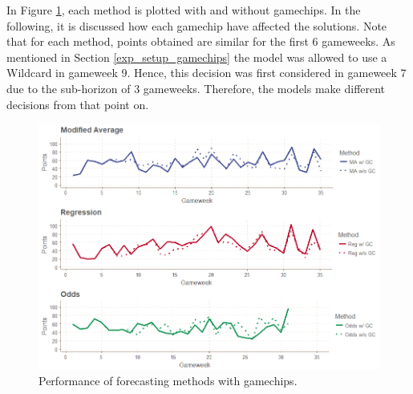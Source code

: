 \begin{table}[H]
\centering
{}
\caption{Results including gamechips.}
\label{tab:res_incl_gamechips}
\end{table}



In Figure \ref{fig:res_comp_gamechips}, each method is plotted with and without gamechips. In the following, it is discussed how each gamechip have affected the solutions. Note that for each method, points obtained are similar for the first 6 gameweeks. As mentioned in Section \ref{exp_setup_gamechips} the model was allowed to use a Wildcard in gameweek 9. Hence, this decision was first considered in gameweek 7 due to the sub-horizon of 3 gameweeks. Therefore, the models make different decisions from that point on.

\begin{figure}[H]
    \centering
    \includegraphics[scale=0.5]{fig/chapter_7/w_wo_gc_all.png}
    \caption{Performance of forecasting methods with gamechips.}
\label{fig:res_comp_gamechips}    
\end{figure}


